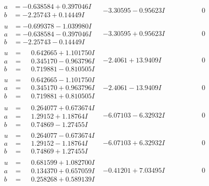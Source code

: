 \documentclass[1p]{elsarticle_modified}
\theoremstyle{definition}
\begin{document}
$$\begin{array}{c|c|c}
\begin{aligned}
a &= -0.638584 + 0.397046 I \\
b &= -2.25743 + 0.14449 I\end{aligned}
 & -3.30595 - 0.95623 I & \phantom{-0.000000 } 0 \\ \hline\begin{aligned}
u &= -0.699378 - 1.039980 I \\
a &= -0.638584 - 0.397046 I \\
b &= -2.25743 - 0.14449 I\end{aligned}
 & -3.30595 + 0.95623 I & \phantom{-0.000000 } 0 \\ \hline\begin{aligned}
u &= \phantom{-}0.642665 + 1.101750 I \\
a &= \phantom{-}0.345170 - 0.963796 I \\
b &= \phantom{-}0.719881 - 0.810505 I\end{aligned}
 & -2.4061 + 13.9409 I & \phantom{-0.000000 } 0 \\ \hline\begin{aligned}
u &= \phantom{-}0.642665 - 1.101750 I \\
a &= \phantom{-}0.345170 + 0.963796 I \\
b &= \phantom{-}0.719881 + 0.810505 I\end{aligned}
 & -2.4061 - 13.9409 I & \phantom{-0.000000 } 0 \\ \hline\begin{aligned}
u &= \phantom{-}0.264077 + 0.673674 I \\
a &= \phantom{-}1.29152 + 1.18764 I \\
b &= \phantom{-}0.74869 - 1.27455 I\end{aligned}
 & -6.07103 - 6.32932 I & \phantom{-0.000000 } 0 \\ \hline\begin{aligned}
u &= \phantom{-}0.264077 - 0.673674 I \\
a &= \phantom{-}1.29152 - 1.18764 I \\
b &= \phantom{-}0.74869 + 1.27455 I\end{aligned}
 & -6.07103 + 6.32932 I & \phantom{-0.000000 } 0 \\ \hline\begin{aligned}
u &= \phantom{-}0.681599 + 1.082700 I \\
a &= \phantom{-}0.134370 + 0.657059 I \\
b &= \phantom{-}0.258268 + 0.589139 I\end{aligned}
 & -0.41201 + 7.03495 I & \phantom{-0.000000 } 0 \\ \hline\begin{aligned}

\end{aligned}
\end{array}$$
\end{document}
